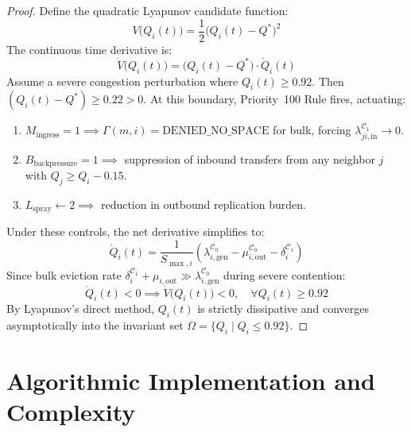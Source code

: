 \documentclass[journal,compsoc]{IEEEtran}
\begin{document}
\begin{proof}
Define the quadratic Lyapunov candidate function:
\begin{equation}
V\bigl(Q_i(t)\bigr) = \frac{1}{2}\bigl(Q_i(t) - Q^*\bigr)^2
\end{equation}
The continuous time derivative is:
\begin{equation}
\dot{V}\bigl(Q_i(t)\bigr) = \bigl(Q_i(t) - Q^*\bigr) \cdot \dot{Q}_i(t)
\end{equation}
Assume a severe congestion perturbation where $Q_i(t) \ge 0.92$. Then $(Q_i(t) - Q^*) \ge 0.22 > 0$. At this boundary, Priority~100 Rule fires, actuating:
\begin{enumerate}
\item $M_{\mathrm{ingress}} = 1 \implies \Gamma(m, i) = \mathrm{DENIED\_NO\_SPACE}$ for bulk, forcing $\lambda_{ji, \mathrm{in}}^{\mathcal{C}_1} \to 0$.
\item $B_{\mathrm{backpressure}} = 1 \implies$ suppression of inbound transfers from any neighbor $j$ with $Q_j \ge Q_i - 0.15$.
\item $L_{\mathrm{spray}} \leftarrow 2 \implies$ reduction in outbound replication burden.
\end{enumerate}
Under these controls, the net derivative simplifies to:
\begin{equation*}
\dot{Q}_i(t) = \frac{1}{S_{\max, i}}\left( \lambda_{i, \mathrm{gen}}^{\mathcal{C}_0} - \mu_{i, \mathrm{out}}^{\mathcal{C}_0} - \delta_{i}^{\mathcal{C}_1} \right)
\end{equation*}
Since bulk eviction rate $\delta_i^{\mathcal{C}_1} + \mu_{i, \mathrm{out}} \gg \lambda_{i, \mathrm{gen}}^{\mathcal{C}_0}$ during severe contention:
\begin{equation*}
\dot{Q}_i(t) < 0 \implies \dot{V}\bigl(Q_i(t)\bigr) < 0, \quad \forall Q_i(t) \ge 0.92
\end{equation*}
By Lyapunov's direct method, $Q_i(t)$ is strictly dissipative and converges asymptotically into the invariant set $\Omega = \{Q_i \mid Q_i \le 0.92\}$.
\end{proof}

\section{Algorithmic Implementation and Complexity}
\end{document}
